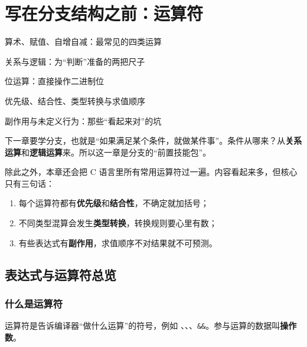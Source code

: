 \chapter{写在分支结构之前：运算符}

\begin{introduction}
  \item 算术、赋值、自增自减：最常见的四类运算
  \item 关系与逻辑：为“判断”准备的两把尺子
  \item 位运算：直接操作二进制位
  \item 优先级、结合性、类型转换与求值顺序
  \item 副作用与未定义行为：那些“看起来对”的坑
\end{introduction}


下一章要学分支，也就是“如果满足某个条件，就做某件事”。条件从哪来？从\textbf{关系运算}和\textbf{逻辑运算}来。所以这一章是分支的“前置技能包”。

除此之外，本章还会把 C 语言里所有常用运算符过一遍。内容看起来多，但核心只有三句话：

\begin{enumerate}
  \item 每个运算符都有\textbf{优先级}和\textbf{结合性}，不确定就加括号；
  \item 不同类型混算会发生\textbf{类型转换}，转换规则要心里有数；
  \item 有些表达式有\textbf{副作用}，求值顺序不对结果就不可预测。
\end{enumerate}

\section{表达式与运算符总览}

\subsection{什么是运算符}

运算符是告诉编译器“做什么运算”的符号，例如 \code{+}、\code{*}、\code{<}、\texttt{\&\&}。参与运算的数据叫\textbf{操作数}。


